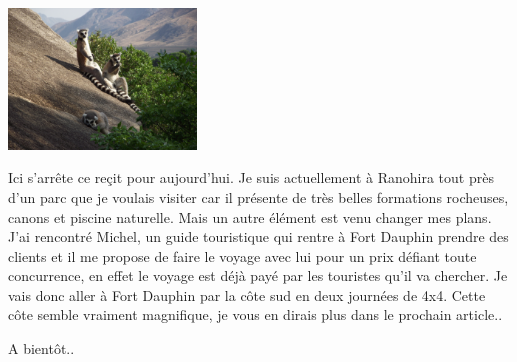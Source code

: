 \begin{multicols}{2}
\smallbreak
\hspace*{-0.65cm}
\includegraphics[width=5cm]{articles/Salut-vazaha/DSCF0262.JPG}
\smallbreak

Ici s'arrête ce reçit pour aujourd'hui. Je suis actuellement à Ranohira tout près d'un parc que je voulais visiter car il présente de très belles formations rocheuses, canons et piscine naturelle. Mais un autre élément est venu changer mes plans. J'ai rencontré Michel, un guide touristique qui rentre à Fort Dauphin prendre des clients et il me propose de faire le voyage avec lui pour un prix défiant toute concurrence, en effet le voyage est déjà payé par les touristes qu'il va chercher. Je vais donc aller à Fort Dauphin par la côte sud en deux journées de 4x4. Cette côte semble vraiment magnifique, je vous en dirais plus dans le prochain article..

A bientôt..

\end{multicols}


